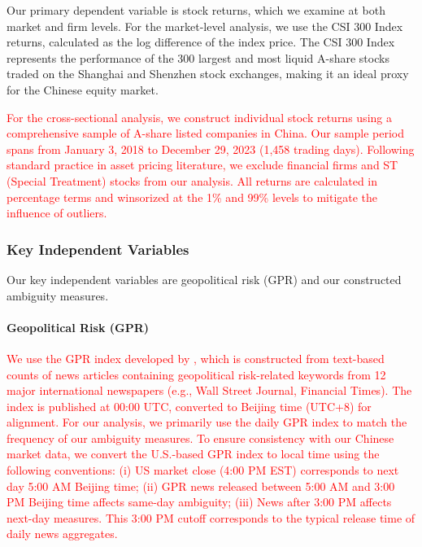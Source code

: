\documentclass[preprint,12pt,authoryear]{elsarticle}
\begin{document}
Our primary dependent variable is stock returns, which we examine at both market and firm levels. For the market-level analysis, we use the CSI 300 Index returns, calculated as the log difference of the index price. The CSI 300 Index represents the performance of the 300 largest and most liquid A-share stocks traded on the Shanghai and Shenzhen stock exchanges, making it an ideal proxy for the Chinese equity market.

\textcolor{red}{For the cross-sectional analysis, we construct individual stock returns using a comprehensive sample of A-share listed companies in China. Our sample period spans from January 3, 2018 to December 29, 2023 (1,458 trading days). Following standard practice in asset pricing literature, we exclude financial firms and ST (Special Treatment) stocks from our analysis. All returns are calculated in percentage terms and winsorized at the 1\% and 99\% levels to mitigate the influence of outliers.}

\subsubsection{Key Independent Variables}

Our key independent variables are geopolitical risk (GPR) and our constructed ambiguity measures.

\paragraph{Geopolitical Risk (GPR)}
\textcolor{red}{We use the GPR index developed by \citet{Caldara2022}, which is constructed from text-based counts of news articles containing geopolitical risk-related keywords from 12 major international newspapers (e.g., Wall Street Journal, Financial Times). The index is published at 00:00 UTC, converted to Beijing time (UTC+8) for alignment. For our analysis, we primarily use the daily GPR index to match the frequency of our ambiguity measures. To ensure consistency with our Chinese market data, we convert the U.S.-based GPR index to local time using the following conventions: (i) US market close (4:00 PM EST) corresponds to next day 5:00 AM Beijing time; (ii) GPR news released between 5:00 AM and 3:00 PM Beijing time affects same-day ambiguity; (iii) News after 3:00 PM affects next-day measures. This 3:00 PM cutoff corresponds to the typical release time of daily news aggregates.}
\end{document}
